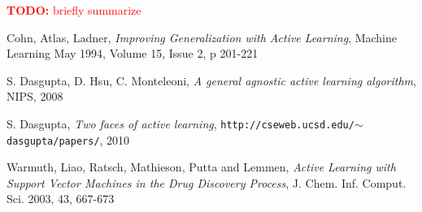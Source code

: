 \documentclass[paper=a4, fontsize=11pt]{scrartcl}
\numberwithin{equation}{section}    %
\numberwithin{figure}{section}      %
\numberwithin{table}{section}       %
\newcommand{\TODO}[1]{\textcolor{red}{\textbf{TODO: } #1}}
\numberwithin{equation}{section}    %
\numberwithin{figure}{section}      %
\numberwithin{table}{section}       %
\begin{document}
\TODO{briefly summarize}


\begin{thebibliography}{1}

Cohn, Atlas, Ladner, \emph{Improving  Generalization  with  Active  Learning},  Machine Learning May 1994, Volume 15, Issue 2, p 201-221

S. Dasgupta, D. Hsu, C. Monteleoni, \emph{A general agnostic active learning algorithm}, NIPS, 2008 

S. Dasgupta, \emph{Two faces of active learning},  \texttt{http://cseweb.ucsd.edu/$\sim$dasgupta/papers/}, 2010

Warmuth, Liao, Ratsch, Mathieson, Putta and Lemmen, \emph{Active Learning with Support Vector Machines in the Drug Discovery Process}, J. Chem. Inf. Comput. Sci. 2003, 43, 667-673

\end{thebibliography}
\end{document}
